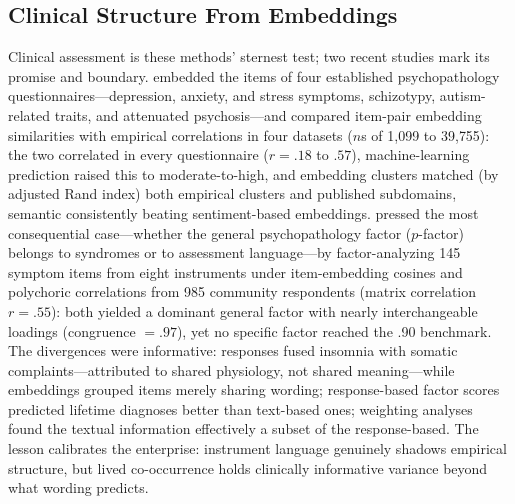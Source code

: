 \subsection{Clinical Structure From Embeddings}

Clinical assessment is these methods' sternest test; two recent studies mark its promise and boundary. \citet{kambeitz-etal-2025} embedded the items of four established psychopathology questionnaires---depression, anxiety, and stress symptoms, schizotypy, autism-related traits, and attenuated psychosis---and compared item-pair embedding similarities with empirical correlations in four datasets ($n$s of 1{,}099 to 39{,}755): the two correlated in every questionnaire ($r = .18$ to $.57$), machine-learning prediction raised this to moderate-to-high, and embedding clusters matched (by adjusted Rand index) both empirical clusters and published subdomains, semantic consistently beating sentiment-based embeddings. \citet{kojima-etal-2026} pressed the most consequential case---whether the general psychopathology factor ($p$-factor) belongs to syndromes or to assessment language---by factor-analyzing 145 symptom items from eight instruments under item-embedding cosines and polychoric correlations from 985 community respondents (matrix correlation $r = .55$): both yielded a dominant general factor with nearly interchangeable loadings (congruence $= .97$), yet no specific factor reached the .90 benchmark. The divergences were informative: responses fused insomnia with somatic complaints---attributed to shared physiology, not shared meaning---while embeddings grouped items merely sharing wording; response-based factor scores predicted lifetime diagnoses better than text-based ones; weighting analyses found the textual information effectively a subset of the response-based. The lesson calibrates the enterprise: instrument language genuinely shadows empirical structure, but lived co-occurrence holds clinically informative variance beyond what wording predicts.
